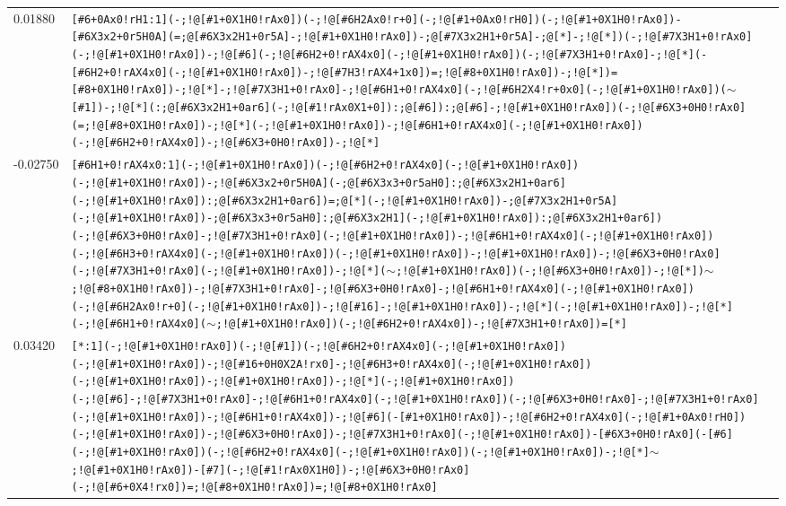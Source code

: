 \begin{longtable}{>{\baselineskip=10pt}p{} >{\baselineskip=10pt}p{}}
0.01880 & \texttt{[\#6+0Ax0!rH1:1](-;!@[\#1+0X1H0!rAx0])(-;!@[\#6H2Ax0!r+0](-;!@[\#1+0Ax0!rH0])(-;!@[\#1+0X1H0!rAx0])-[\#6X3x2+0r5H0A](=;@[\#6X3x2H1+0r5A]-;!@[\#1+0X1H0!rAx0])-;@[\#7X3x2H1+0r5A]-;@[*]-;!@[*])(-;!@[\#7X3H1+0!rAx0](-;!@[\#1+0X1H0!rAx0])-;!@[\#6](-;!@[\#6H2+0!rAX4x0](-;!@[\#1+0X1H0!rAx0])(-;!@[\#7X3H1+0!rAx0]-;!@[*](-[\#6H2+0!rAX4x0](-;!@[\#1+0X1H0!rAx0])-;!@[\#7H3!rAX4+1x0])=;!@[\#8+0X1H0!rAx0])-;!@[*])=[\#8+0X1H0!rAx0])-;!@[*]-;!@[\#7X3H1+0!rAx0]-;!@[\#6H1+0!rAX4x0](-;!@[\#6H2X4!r+0x0](-;!@[\#1+0X1H0!rAx0])($\sim$[\#1])-;!@[*](:;@[\#6X3x2H1+0ar6](-;!@[\#1!rAx0X1+0]):;@[\#6]):;@[\#6]-;!@[\#1+0X1H0!rAx0])(-;!@[\#6X3+0H0!rAx0](=;!@[\#8+0X1H0!rAx0])-;!@[*](-;!@[\#1+0X1H0!rAx0])-;!@[\#6H1+0!rAX4x0](-;!@[\#1+0X1H0!rAx0])(-;!@[\#6H2+0!rAX4x0])-;!@[\#6X3+0H0!rAx0])-;!@[*]} \\ 
-0.02750 & \texttt{[\#6H1+0!rAX4x0:1](-;!@[\#1+0X1H0!rAx0])(-;!@[\#6H2+0!rAX4x0](-;!@[\#1+0X1H0!rAx0])(-;!@[\#1+0X1H0!rAx0])-;!@[\#6X3x2+0r5H0A](-;@[\#6X3x3+0r5aH0]:;@[\#6X3x2H1+0ar6](-;!@[\#1+0X1H0!rAx0]):;@[\#6X3x2H1+0ar6])=;@[*](-;!@[\#1+0X1H0!rAx0])-;@[\#7X3x2H1+0r5A](-;!@[\#1+0X1H0!rAx0])-;@[\#6X3x3+0r5aH0]:;@[\#6X3x2H1](-;!@[\#1+0X1H0!rAx0]):;@[\#6X3x2H1+0ar6])(-;!@[\#6X3+0H0!rAx0]-;!@[\#7X3H1+0!rAx0](-;!@[\#1+0X1H0!rAx0])-;!@[\#6H1+0!rAX4x0](-;!@[\#1+0X1H0!rAx0])(-;!@[\#6H3+0!rAX4x0](-;!@[\#1+0X1H0!rAx0])(-;!@[\#1+0X1H0!rAx0])-;!@[\#1+0X1H0!rAx0])-;!@[\#6X3+0H0!rAx0](-;!@[\#7X3H1+0!rAx0](-;!@[\#1+0X1H0!rAx0])-;!@[*]($\sim$;!@[\#1+0X1H0!rAx0])(-;!@[\#6X3+0H0!rAx0])-;!@[*])$\sim$;!@[\#8+0X1H0!rAx0])-;!@[\#7X3H1+0!rAx0]-;!@[\#6X3+0H0!rAx0]-;!@[\#6H1+0!rAX4x0](-;!@[\#1+0X1H0!rAx0])(-;!@[\#6H2Ax0!r+0](-;!@[\#1+0X1H0!rAx0])-;!@[\#16]-;!@[\#1+0X1H0!rAx0])-;!@[*](-;!@[\#1+0X1H0!rAx0])-;!@[*](-;!@[\#6H1+0!rAX4x0]($\sim$;!@[\#1+0X1H0!rAx0])(-;!@[\#6H2+0!rAX4x0])-;!@[\#7X3H1+0!rAx0])=[*]} \\ 
0.03420 & \texttt{[*:1](-;!@[\#1+0X1H0!rAx0])(-;!@[\#1])(-;!@[\#6H2+0!rAX4x0](-;!@[\#1+0X1H0!rAx0])(-;!@[\#1+0X1H0!rAx0])-;!@[\#16+0H0X2A!rx0]-;!@[\#6H3+0!rAX4x0](-;!@[\#1+0X1H0!rAx0])(-;!@[\#1+0X1H0!rAx0])-;!@[\#1+0X1H0!rAx0])-;!@[*](-;!@[\#1+0X1H0!rAx0])(-;!@[\#6]-;!@[\#7X3H1+0!rAx0]-;!@[\#6H1+0!rAX4x0](-;!@[\#1+0X1H0!rAx0])(-;!@[\#6X3+0H0!rAx0]-;!@[\#7X3H1+0!rAx0](-;!@[\#1+0X1H0!rAx0])-;!@[\#6H1+0!rAX4x0])-;!@[\#6](-[\#1+0X1H0!rAx0])-;!@[\#6H2+0!rAX4x0](-;!@[\#1+0Ax0!rH0])(-;!@[\#1+0X1H0!rAx0])-;!@[\#6X3+0H0!rAx0])-;!@[\#7X3H1+0!rAx0](-;!@[\#1+0X1H0!rAx0])-[\#6X3+0H0!rAx0](-[\#6](-;!@[\#1+0X1H0!rAx0])(-;!@[\#6H2+0!rAX4x0](-;!@[\#1+0X1H0!rAx0])(-;!@[\#1+0X1H0!rAx0])-;!@[*]$\sim$;!@[\#1+0X1H0!rAx0])-[\#7](-;!@[\#1!rAx0X1H0])-;!@[\#6X3+0H0!rAx0](-;!@[\#6+0X4!rx0])=;!@[\#8+0X1H0!rAx0])=;!@[\#8+0X1H0!rAx0]} \\ 

\end{longtable}
